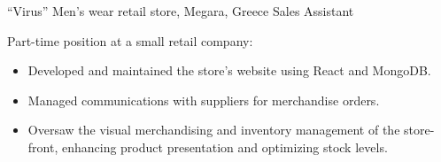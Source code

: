 {“Virus” Men’s wear retail store, Megara, Greece}
{Sales Assistant}
{
    Part-time position at a small retail company:
    \begin{itemize}
        \item Developed and maintained the store’s website using React and MongoDB.
        \item Managed communications with suppliers for merchandise orders.
        \item Oversaw the visual merchandising and inventory management of the store-front, enhancing product presentation and optimizing stock levels.
    \end{itemize}
}
